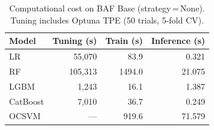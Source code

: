 \begin{table}[ht]
\centering
\caption{Computational cost on BAF Base (strategy\,=\,None). Tuning includes Optuna TPE (50 trials, 5-fold CV).}
\label{tab:cost_baf}
\begin{tabular}{l r r r}
\toprule
Model & Tuning (s) & Train (s) & Inference (s) \\
\midrule
LR         & 55,070 & 83.9 & 0.321 \\
RF         & 105,313 & 1494.0 & 21.075 \\
LGBM       & 1,243 & 16.1 & 1.387 \\
CatBoost   & 7,010 & 36.7 & 0.249 \\
OCSVM      & --- & 919.6 & 71.579 \\
\bottomrule
\end{tabular}
\end{table}